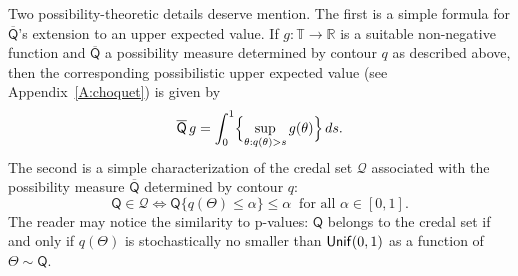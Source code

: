 \documentclass[a4paper, 12pt]{article}
\theoremstyle{plain}
\theoremstyle{definition}
\theoremstyle{remark}
\newcommand{\unif}{{\sf Unif}}
\newcommand{\RR}{\mathbb{R}}
\newcommand{\TT}{\mathbb{T}}
\newcommand{\prior}{\mathsf{Q}}
\newcommand{\credal}{\mathscr{Q}}
\newcommand{\lprior}{\underline{\mathsf{Q}}}
\newcommand{\uprior}{\overline{\mathsf{Q}}}
\begin{document}
Two possibility-theoretic details deserve mention.  The first is a simple formula for $\uprior$'s extension to an upper expected value.  
If $g: \TT \to \RR$ is a suitable non-negative function and $\uprior$ a possibility measure determined by contour $q$ as described above, then the corresponding possibilistic upper expected value (see Appendix~\ref{A:choquet})
is given by
\begin{equation}
\label{eq:upper.e.poss}
\uprior \, g = \int_0^1 \Bigl\{ \sup_{\theta: q(\theta) > s} g(\theta) \Bigr\} \, ds.
\end{equation}
The second is a simple characterization \citep{cuoso.etal.2001, dubois.etal.2004} of the credal set $\credal$ associated with the possibility measure $\uprior$ determined by contour $q$:
\begin{equation}
\label{eq:credal.char}
\prior \in \credal \iff \prior\{ q(\Theta) \leq \alpha \} \leq \alpha \;\; \text{for all $\alpha \in [0,1]$}. 
\end{equation}
The reader may notice the similarity to p-values: $\prior$ belongs to the credal set if and only if $q(\Theta)$ is stochastically no smaller than $\unif(0,1)$ as a function of $\Theta \sim \prior$.  



\end{document}
